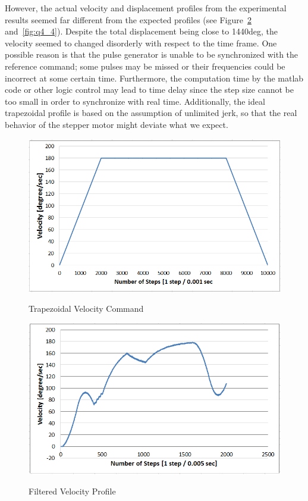 \documentclass{article}
\theoremstyle{plain}
\theoremstyle{definition}
\theoremstyle{remark}
\begin{document}
However, the actual velocity and displacement profiles from the experimental results seemed far different from the expected profiles (see Figure~\ref{fig:q4_3} and~\ref{fig:q4_4}). Despite the total displacement being close to 1440deg, the velocity seemed to changed disorderly with respect to the time frame. One possible reason is that the pulse generator is unable to be synchronized with the reference command; some pulses may be missed or their frequencies could be incorrect at some certain time. Furthermore, the computation time by the matlab code or other logic control may lead to time delay since the step size cannot be too small in order to synchronize with real time. Additionally, the ideal trapezoidal profile is based on the assumption of unlimited jerk, so that the real behavior of the stepper motor might deviate what we expect.\\

\begin{figure}[h!]
\begin{center}
\includegraphics[width=12cm]{Q4_CommandGeneration.png}
\caption{Trapezoidal Velocity Command} \label{tex}
\label{fig:q4_2}
\end{center}
\end{figure}

\begin{figure}[b!]
\begin{center}
\includegraphics[width=12cm]{Q4_Trapezoid_Velocity_Fail.png}
\caption{Filtered Velocity Profile} \label{tex}
\label{fig:q4_3}
\end{center}
\end{figure}
  
\end{document}
